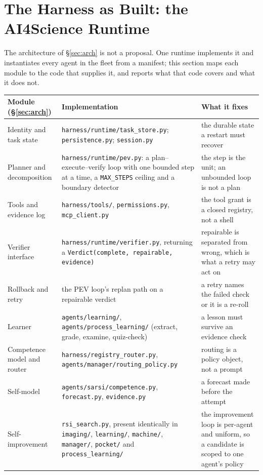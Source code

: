 \section{The Harness as Built: the AI4Science Runtime}\label{sec:ai4science}

The architecture of \S\ref{sec:arch} is not a proposal. One runtime implements it and instantiates every agent in the fleet from a manifest; this section maps each module to the code that supplies it, and reports what that code covers and what it does not.

\begin{table}[!htbp]
\centering\scriptsize
\begin{tabularx}{\textwidth}{@{}lYY@{}}
\toprule
Module (\S\ref{sec:arch}) & Implementation & What it fixes \\
\midrule
Identity and task state & \texttt{harness/runtime/task\_store.py}; \texttt{persistence.py}; \texttt{session.py} & the durable state a restart must recover \\
Planner and decomposition & \texttt{harness/runtime/pev.py}: a plan--execute--verify loop with one bounded step at a time, a \texttt{MAX\_STEPS} ceiling and a boundary detector & the step is the unit; an unbounded loop is not a plan \\
Tools and evidence log & \texttt{harness/tools/}, \texttt{permissions.py}, \texttt{mcp\_client.py} & the tool grant is a closed registry, not a shell \\
Verifier interface & \texttt{harness/runtime/verifier.py}, returning a \texttt{Verdict(complete, repairable, evidence)} & repairable is separated from wrong, which is what a retry may act on \\
Rollback and retry & the PEV loop's replan path on a repairable verdict & a retry names the failed check or it is a re-roll \\
Learner & \texttt{agents/learning/}, \texttt{agents/process\_learning/} (extract, grade, examine, quiz-check) & a lesson must survive an evidence check \\
Competence model and router & \texttt{harness/registry\_router.py}, \texttt{agents/manager/routing\_policy.py} & routing is a policy object, not a prompt \\
Self-model & \texttt{agents/sarsi/competence.py}, \texttt{forecast.py}, \texttt{evidence.py} & a forecast made before the attempt \\
Self-improvement & \texttt{rsi\_search.py}, present identically in \texttt{imaging/}, \texttt{learning/}, \texttt{machine/}, \texttt{manager/}, \texttt{pocket/} and \texttt{process\_learning/} & the improvement loop is per-agent and uniform, so a candidate is scoped to one agent's policy \\

\end{tabularx}
\end{table}
